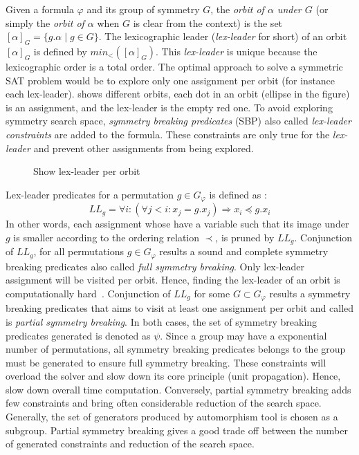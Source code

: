Given a formula $\varphi$ and its group of symmetry $G$,
the \emph{orbit of $\alpha$ under $G$} (or
simply the \emph{orbit of $\alpha$} when $G$ is clear from the context) is the set
$ [\alpha]_G=\{ g.\alpha \mid g \in G \}$. 
The lexicographic leader (\textit{lex-leader} for short) of an orbit $[\alpha]_G$ is defined by
$min_<([\alpha]_G)$. This \textit{lex-leader} is unique because the lexicographic
order is a total order.
The optimal approach to solve a symmetric SAT problem would be to explore
only one assignment per orbit (for instance each lex-leader).  shows different orbits, each dot in an orbit (ellipse in the figure) is an assignment, and the lex-leader is the empty red one.
To avoid exploring 
symmetry search space, \emph{symmetry breaking predicates} (SBP) also called \emph{lex-leader constraints} 
are added to the formula.
These constraints are only true for the \emph{lex-leader} \cite{crawford1996symmetry} and prevent other assignments from being explored. 
\begin{figure}[!htbp]
 \centering
 
 \caption{Show lex-leader per orbit}
 \label{fig:lex-leader}
\end{figure}

Lex-leader predicates for a permutation $g \in G_\varphi$ is defined as :
$$LL_g = \forall i : (\forall j < i : x_j = g.x_j) \Rightarrow  x_i \preceq g.x_i$$
In other words, each assignment whose have a variable such that its image under $g$ is smaller according to the ordering relation $\prec$, is pruned by $LL_g$.
Conjunction of $LL_g$, for all permutations  $g \in G_{\varphi} $ results a sound and complete symmetry breaking predicates also called \emph{full symmetry breaking}. Only lex-leader assignment will be visited 
per orbit. Hence, finding the lex-leader of an orbit is computationally hard~\cite{Luks2004}. 
Conjunction of $LL_g$ for some $G \subset G_{\varphi}$ results a symmetry breaking predicates that aims to
visit at least one assignment per orbit and called is \emph{partial symmetry breaking}.
In both cases, the set of symmetry breaking predicates generated is denoted as $\psi$.
Since  a group may have a exponential number of permutations, all symmetry breaking predicates belongs
to the group must be generated to ensure full symmetry breaking. These constraints will overload the 
solver and slow down its core principle (unit propagation). Hence, slow down overall time computation.
Conversely, partial symmetry breaking adds few constraints and bring often considerable reduction of the
search space. Generally, the set of generators produced by automorphism tool is chosen as a subgroup.
Partial symmetry breaking gives a good trade off between the number of generated constraints and reduction of the search space.

